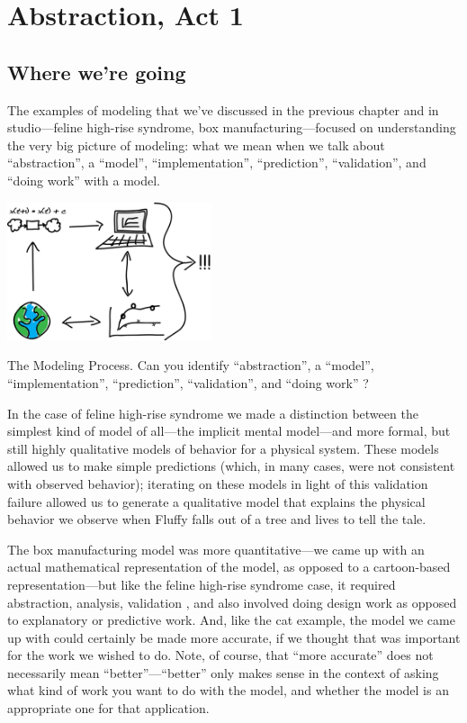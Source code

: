 \chapter{Abstraction, Act 1}


\section*{Where we're going}

The examples of modeling that we've discussed in the previous chapter and in studio---feline high-rise syndrome, box manufacturing---focused on understanding the very big picture of modeling:  what we mean when we talk about ``abstraction'', a ``model'', ``implementation'',  ``prediction'', ``validation'', and ``doing work'' with a model.  

\begin{marginfigure}
\includegraphics[width=6cm]{figs/ModsimDiagram}
\caption{The Modeling Process.  Can you identify ``abstraction'', a ``model'', ``implementation'',  ``prediction'', ``validation'', and ``doing work'' ? 
 }
\end{marginfigure}
In the case of feline high-rise syndrome we made a distinction between the simplest kind of model of all---the implicit mental model---and more formal, but still highly qualitative models of behavior for a physical system.  These models allowed us to make simple predictions (which, in many cases, were not consistent with observed behavior); iterating on these models in light of this validation failure allowed us to generate a qualitative model that explains the physical behavior we observe when Fluffy falls out of a tree and lives to tell the tale.  

The box manufacturing model was more quantitative---we came up with an actual mathematical representation of the model, as opposed to a cartoon-based representation---but like the feline high-rise syndrome case, it required abstraction, analysis, validation , and also involved doing design work as opposed to explanatory or predictive work.  And, like the cat example, the model we came up with could certainly be made more accurate, if we thought that was important for the work we wished to do.  Note, of course, that ``more accurate'' does not necessarily mean ``better''---``better'' only makes sense in the context of asking what kind of work you want to do with the model, and whether the model is an appropriate one for that application.

